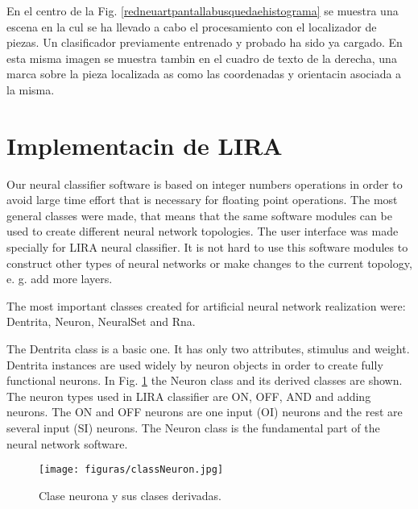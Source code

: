En el centro de la Fig. \ref{redneuartpantallabusquedaehistograma} se muestra una escena en la cul se ha llevado a cabo el procesamiento con el localizador de piezas. Un clasificador previamente entrenado y probado ha sido ya cargado. En esta misma imagen se muestra tambin en el cuadro de texto de la derecha, una marca sobre la pieza localizada as como las coordenadas y orientacin asociada a la misma.

\begin{figure}[h]
\end{figure}

\section{Implementacin de LIRA}
Our neural classifier software is based on integer numbers operations in order
to avoid large time effort that is necessary for floating point operations.
The most general classes were made, that means that the same software modules
can be used to create different neural network topologies. The user
interface was made specially for LIRA neural classifier. It
is not hard to use this software modules to construct other types
of neural networks or make changes to the current topology, e. g.
add more layers. 

The most important classes created for artificial neural network realization
were: Dentrita, Neuron, NeuralSet and Rna.

The Dentrita class is a basic one. It has only two attributes, stimulus
and weight. Dentrita instances are used widely by neuron objects in
order to create fully functional neurons. In Fig. \ref{classneuron}
the Neuron class and its derived classes are shown. The neuron types used in LIRA classifier
are ON, OFF, AND and adding neurons. The ON and OFF neurons are one
input (OI) neurons and the rest are several input (SI) neurons. The
Neuron class is the fundamental part of the neural network software.

\begin{figure}[h]
\begin{center} \texttt{[image: figuras/classNeuron.jpg]}\end{center}
\caption{Clase neurona y sus clases derivadas.}
\label{classneuron}
\end{figure}

